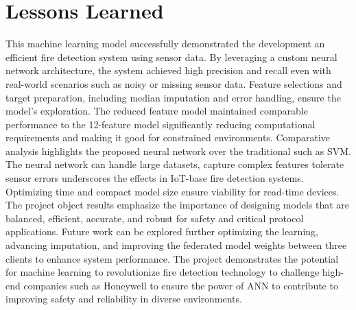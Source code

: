 \documentclass[conference]{IEEEtran}
\begin{document}
\section{Lessons Learned}
This machine learning model successfully demonstrated the
development an efficient fire detection system using sensor
data. By leveraging a custom neural network architecture,
the system achieved high precision and recall even with
real-world scenarios such as noisy or missing sensor data.
Feature selections and target preparation, including median
imputation and error handling, ensure the model's
exploration. The reduced feature model maintained comparable
performance to the 12-feature model significantly reducing
computational requirements and making it good for
constrained environments. Comparative analysis highlights
the proposed neural network over the traditional such as
SVM. The neural network can handle large datasets, capture
complex features tolerate sensor errors underscores the
effects in IoT-base fire detection systems. Optimizing time
and compact model size ensure viability for read-time
devices. The project object results emphasize the importance
of designing models that are balanced, efficient, accurate,
and robust for safety and critical protocol applications.
Future work can be explored further optimizing the learning,
advancing imputation, and improving the federated model
weights between three clients to enhance system performance.
The project demonstrates the potential for machine learning
to revolutionize fire detection technology to challenge
high-end companies such as Honeywell to ensure the power of
ANN to contribute to improving safety and reliability in
diverse environments.
\end{document}
